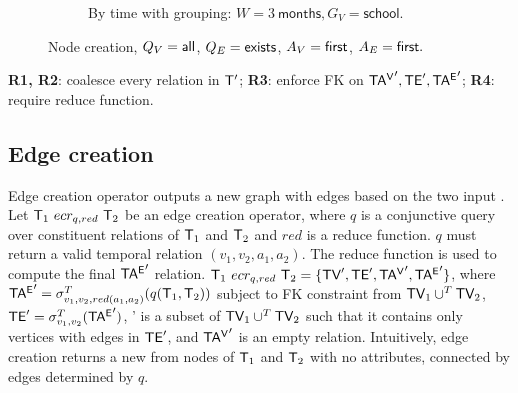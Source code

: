 \begin{figure}[t]
\begin{subfigure}[b]{0.5\textwidth}
\caption{By time with grouping: $W=3~\textsf{months}, G_V=\textsf{school}$.}
\label{fig:tg_agg4}
\end{subfigure}
\caption[]{Node creation, $Q_V=\textsf{all}$, $Q_E=\textsf{exists}$,
  $A_V=\textsf{first}$, $A_E=\textsf{first}.$}
\label{fig:tg_agg}
\vspace{-0.5cm}
\end{figure}


{\bf R1, R2}: coalesce every relation in $\mathsf{T}'$; {\bf R3}: enforce FK
on $\mathsf{TA^{V}}', \textsf{TE}', \mathsf{TA^{E}}'$; {\bf R4}: require reduce function.


\subsection{Edge creation}
\label{sec:algebra:ecreate}

Edge creation operator outputs a new graph with edges based on the two
input \tgs.  Let $\mathsf{T}_1~ecr_{q,red}~\mathsf{T}_2$ be an edge creation
operator, where $q$ is a conjunctive query over constituent relations
of $\mathsf{T}_1$ and $\mathsf{T}_2$ and $red$ is a reduce function. $q$ must
return a valid temporal relation $(v_1, v_2, a_1, a_2)$.  The reduce
function is used to compute the final $\mathsf{TA^{E}}'$ relation.
$\mathsf{T}_1~ecr_{q,red}~\mathsf{T}_2 = \{ \textsf{TV}', \textsf{TE}', \mathsf{TA^{V}}', \mathsf{TA^{E}}' \}$, where
$\mathsf{TA^{E}}' = \sigma^T_{v_1,v_2,red(a_1,a_2)}(q(\mathsf{T}_1, \mathsf{T}_2))$ subject
to FK constraint from $\textsf{TV}_1 \cup^T \textsf{TV}_2$, $\textsf{TE}' =
\sigma^T_{v_1,v_2}(\mathsf{TA^{E}}')$, \tv' is a subset of $\textsf{TV}_1 \cup^T \textsf{TV}_2$
such that it contains only vertices with edges in $\textsf{TE}'$, and $\mathsf{TA^{V}}'$
is an empty relation.  Intuitively, edge creation returns a new \tg
from nodes of $\mathsf{T}_1$ and $\mathsf{T}_2$ with no attributes, connected by
edges determined by $q$.

